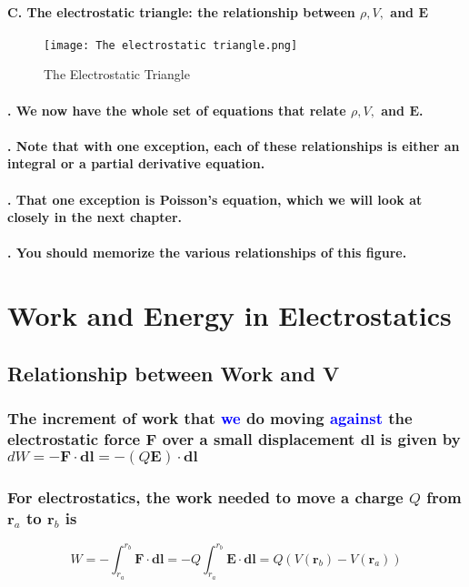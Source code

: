 \documentclass{article}
\begin{document}
\paragraph{C. The electrostatic triangle: the relationship between $\rho, V,$ and $\boldsymbol{E}$}
\begin{figure}[h]
    \centering
    \texttt{[image: The electrostatic triangle.png]}
    \caption{The Electrostatic Triangle}
    \label{fig:my_label}
\end{figure}
\paragraph{. We now have the whole set of equations that relate $\rho, V,$ and $\boldsymbol{E}$.}
\paragraph{. Note that with one exception, each of these relationships is either an integral or a partial derivative equation.}
\paragraph{. That one exception is Poisson's equation, which we will look at closely in the next chapter.}
\paragraph{. You should memorize the various relationships of this figure.}
\section{Work and Energy in Electrostatics}
\subsection{Relationship between Work and V}
\subsubsection{The increment of work that \textcolor{blue}{we} do moving \textcolor{blue}{against} the electrostatic force $\boldsymbol{F}$ over a small displacement $\boldsymbol{dl}$ is given by $dW=-\boldsymbol{F\cdot dl}=-(Q\boldsymbol{E})\cdot \boldsymbol{dl}$}
\subsubsection{For electrostatics, the work needed to move a charge $Q$ from $\boldsymbol{r}_a$ to $\boldsymbol{r}_b$ is}
\begin{equation*}
    W=-\int_{r_a}^{r_b}\boldsymbol{F\cdot dl}=-Q\int_{r_a}^{r_b}\boldsymbol{E\cdot dl}=Q(V(\boldsymbol{r}_b)-V(\boldsymbol{r}_a))
\end{equation*}
\end{document}
